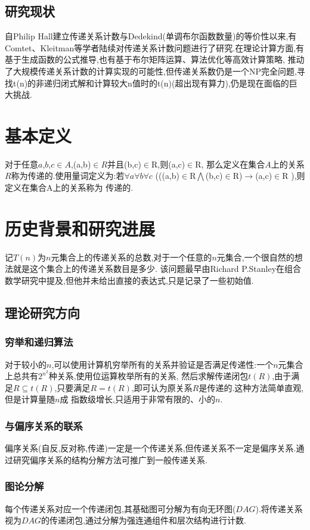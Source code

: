 \documentclass[12pt]{article}
\theoremstyle{definition}
\begin{document}
\subsection{研究现状}
自Philip Hall建立传递关系计数与Dedekind(单调布尔函数数量)的等价性以来,有Comtet、Kleitman等学者陆续对传递关系计数问题进行了研究.在理论计算方面,有基于生成函数的公式推导,也有基于布尔矩阵运算、算法优化等高效计算策略,
推动了大规模传递关系计数的计算实现的可能性,但传递关系数仍是一个NP完全问题,寻找t(n)的非递归闭式解和计算较大n值时的t(n)(超出现有算力),仍是现在面临的巨大挑战.


\section{基本定义}
对于任意$a$,$b$,$c$$\in$$A$,(a,b)$\in$$R$并且(b,c)$\in$R,则(a,c)$\in$R,
那么定义在集合$A$上的关系$R$称为传递的.使用量词定义为:若$\forall a$$\forall b$$\forall c$ 
(((a,b)$\in$R$\bigwedge$(b,c)$\in$R)$\rightarrow $(a,c)$\in$R ),则定义在集合A上的关系称为
传递的.
\section{历史背景和研究进展}
记$T(n)$为$n$元集合上的传递关系的总数,对于一个任意的$n$元集合,一个很自然的想法就是这个集合上的传递关系数目是多少.
该问题最早由Richard P.Stanley在组合数学研究中提及,但他并未给出直接的表达式,只是记录了一些初始值.
\subsection{理论研究方向}
\subsubsection{穷举和递归算法}
对于较小的$n$,可以使用计算机穷举所有的关系并验证是否满足传递性:一个$n$元集合上总共有$2^{n^{2}}$种关系,使用位运算枚举所有的关系,
然后求解传递闭包$t(R)$,由于满足$R\subseteq t(R)$,只要满足$R=t(R)$,即可认为原关系$R$是传递的.这种方法简单直观,但是计算量随$n$成
指数级增长,只适用于非常有限的、小的$n$.
\subsubsection{与偏序关系的联系}
偏序关系(自反,反对称,传递)一定是一个传递关系,但传递关系不一定是偏序关系.通过研究偏序关系的结构分解方法可推广到一般传递关系.
\subsubsection{图论分解}
每个传递关系对应一个传递闭包,其基础图可分解为有向无环图($DAG$).将传递关系视为$DAG$的传递闭包,通过分解为强连通组件和层次结构进行计数.
\end{document}
